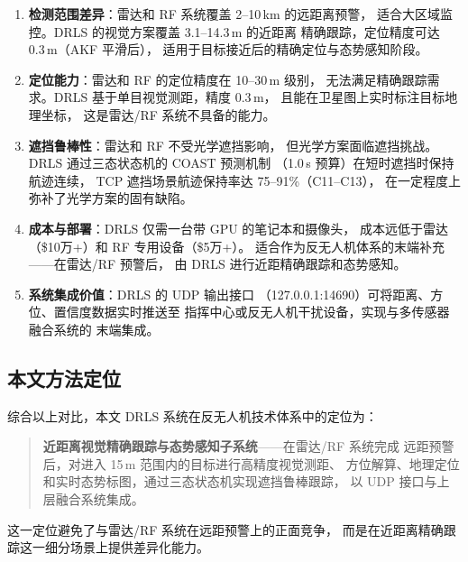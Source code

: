 \documentclass[12pt, a4paper]{ctexart}
\begin{document}
\begin{enumerate}
  \item \textbf{检测范围差异}：雷达和 RF 系统覆盖 2--10\,km 的远距离预警，
        适合大区域监控。DRLS 的视觉方案覆盖 3.1--14.3\,m 的近距离
        精确跟踪，定位精度可达 0.3\,m（AKF 平滑后），
        适用于目标接近后的精确定位与态势感知阶段。

  \item \textbf{定位能力}：雷达和 RF 的定位精度在 10--30\,m 级别，
        无法满足精确跟踪需求。DRLS 基于单目视觉测距，精度 0.3\,m，
        且能在卫星图上实时标注目标地理坐标，
        这是雷达/RF 系统不具备的能力。

  \item \textbf{遮挡鲁棒性}：雷达和 RF 不受光学遮挡影响，
        但光学方案面临遮挡挑战。DRLS 通过三态状态机的 COAST 预测机制
        （1.0\,s 预算）在短时遮挡时保持航迹连续，
        TCP 遮挡场景航迹保持率达 75--91\%（C11--C13），
        在一定程度上弥补了光学方案的固有缺陷。

  \item \textbf{成本与部署}：DRLS 仅需一台带 GPU 的笔记本和摄像头，
        成本远低于雷达（\$10万+）和 RF 专用设备（\$5万+）。
        适合作为反无人机体系的末端补充——在雷达/RF 预警后，
        由 DRLS 进行近距精确跟踪和态势感知。

  \item \textbf{系统集成价值}：DRLS 的 UDP 输出接口
        （127.0.0.1:14690）可将距离、方位、置信度数据实时推送至
        指挥中心或反无人机干扰设备，实现与多传感器融合系统的
        末端集成。
\end{enumerate}

\subsection{本文方法定位}

综合以上对比，本文 DRLS 系统在反无人机技术体系中的定位为：

\begin{quote}
\textbf{近距离视觉精确跟踪与态势感知子系统}——在雷达/RF 系统完成
远距预警后，对进入 15\,m 范围内的目标进行高精度视觉测距、
方位解算、地理定位和实时态势标图，通过三态状态机实现遮挡鲁棒跟踪，
以 UDP 接口与上层融合系统集成。
\end{quote}

这一定位避免了与雷达/RF 系统在远距预警上的正面竞争，
而是在近距离精确跟踪这一细分场景上提供差异化能力。

\end{document}
